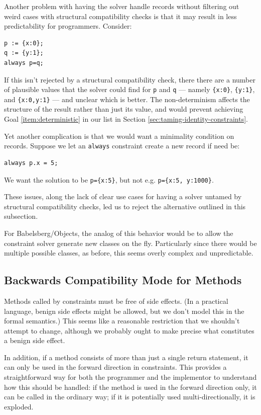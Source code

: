 \documentclass{article}
\begin{document}
Another problem with having the solver handle records without
filtering out weird cases with structural compatibility checks is that
it may result in less predictability for programmers.  Consider:

\begin{verbatim}
p := {x:0};
q := {y:1};
always p=q;
\end{verbatim}

If this isn't rejected by a structural compatibility check, there
there are a number of plausible values that the solver could find for
{\tt p} and {\tt q} --- namely \verb|{x:0}|, \verb|{y:1}|, and
\verb|{x:0,y:1}| --- and unclear which is better.  The non-determinism
affects the structure of the result rather than just its value, and
would prevent achieving Goal \ref{item:deterministic} in our list in
Section \ref{sec:taming-identity-constraints}.

Yet another complication is that we would want a minimality condition
on records.  Suppose we let an \verb|always| constraint create a new
record if need be:
\begin{verbatim}
always p.x = 5;
\end{verbatim}
We want the solution to be \verb|p={x:5}|, but not e.g.
\verb|p={x:5, y:1000}|.

These issues, along the lack of clear use cases for having a solver
untamed by structural compatibility checks, led us to reject the
alternative outlined in this subsection.

For Babelsberg/Objects, the analog of this behavior would be to allow
the constraint solver generate new classes on the fly.  Particularly
since there would be multiple possible classes, as before, this seems
overly complex and unpredictable.

\subsection{Backwards Compatibility Mode for Methods}
\label{sec:backwards-compatibility-mode}

Methods called by constraints must be free of side effects.  (In a
practical language, benign side effects might be allowed, but we don't
model this in the formal semantics.)  This seems like a reasonable
restriction that we shouldn't attempt to change, although we probably
ought to make precise what constitutes a benign side effect.

In addition, if a method consists of more than just a single return
statement, it can only be used in the forward direction in
constraints.  This provides a straightforward way for both the
programmer and the implementor to understand how this should be
handled: if the method is used in the forward direction only, it can
be called in the ordinary way; if it is potentially used
multi-directionally, it is exploded.
\end{document}
